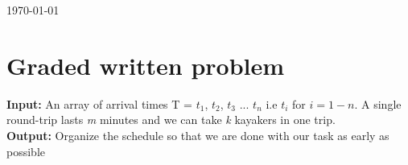 \documentclass[8pt]{article}
\begin{document}
\hfill \small{\today} \\
\setlength{\fboxrule}{.5mm}\setlength{\fboxsep}{1.2mm}
\newlength{\boxlength}\setlength{\boxlength}{\textwidth}
\addtolength{\boxlength}{-4mm}
\begin{center}\end{center}
\vspace{5mm}

\section{Graded written problem}

\textbf{Input:} An array of arrival times T = $t_1$, $t_2$, $t_3$ $...$ $t_n$ i.e $t_i$ for $i = 1 - n$. A single round-trip lasts \textit{m} minutes and we can take \textit{k} kayakers in one trip.
\\
\textbf{Output:} Organize the schedule so that we are done with our task as early as possible
\end{document}
